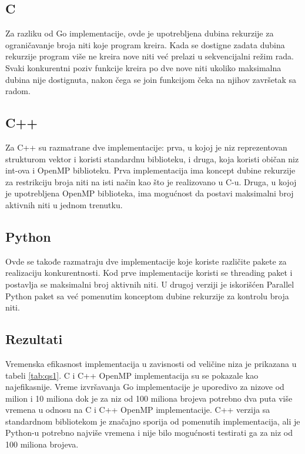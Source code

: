 \documentclass[12pt,oneside]{memoir}
\begin{document}
\subsection{C}
Za razliku od Go implementacije, ovde je upotrebljena dubina rekurzije za ograničavanje broja niti koje program kreira. Kada se dostigne zadata dubina rekurzije program više ne kreira nove niti već prelazi u sekvencijalni režim rada. Svaki konkurentni poziv funkcije kreira po dve nove niti ukoliko maksimalna dubina nije dostignuta, nakon čega se join funkcijom čeka na njihov završetak sa radom.

\subsection{C++}
Za C++ su razmatrane dve implementacije: prva, u kojoj je niz reprezentovan strukturom vektor i koristi standardnu biblioteku, i druga, koja koristi običan niz int-ova i OpenMP biblioteku. 
Prva implementacija ima koncept dubine rekurzije za restrikciju broja niti na isti način kao što je realizovano u C-u. Druga, u kojoj je upotrebljena OpenMP biblioteka, ima mogućnost da postavi maksimalni broj aktivnih niti u jednom trenutku.

\subsection{Python}
Ovde se takođe razmatraju dve implementacije koje koriste različite pakete za realizaciju konkurentnosti. Kod prve implementacije koristi se threading paket i postavlja se maksimalni broj aktivnih niti. U drugoj verziji je iskorišćen Parallel Python paket sa već pomenutim konceptom dubine rekurzije za kontrolu broja niti. 

\subsection{Rezultati}\label{qs:rez}

Vremenska efikasnost implementacija u zavisnosti od veličine niza je prikazana u tabeli \ref{tab:qs1}.  C i C++ OpenMP implementacija su se pokazale kao najefikasnije. Vreme izvršavanja Go implementacije je uporedivo za nizove od milion i 10 miliona dok je za niz od 100 miliona brojeva potrebno dva puta više vremena u odnosu na C i C++ OpenMP implementacije. C++ verzija sa standardnom bibliotekom je značajno sporija od pomenutih implementacija, ali je Python-u potrebno najviše vremena i nije bilo mogućnosti testirati ga za niz od 100 miliona brojeva.
\end{document}
